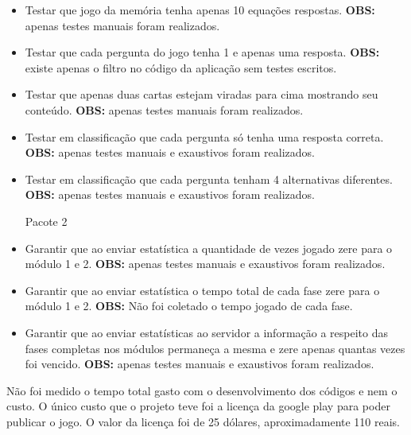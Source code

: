 \begin{itemize}
\item Testar que jogo da memória tenha apenas 10 equações respostas. \textbf{OBS:} apenas testes manuais foram realizados.  

\item Testar que cada pergunta do jogo tenha 1 e apenas uma resposta. \textbf{OBS:} existe apenas o filtro no código da aplicação sem testes escritos.  

\item Testar que apenas duas cartas estejam viradas para cima mostrando seu conteúdo. \textbf{OBS:} apenas testes manuais foram realizados.  

\item Testar em classificação que cada pergunta só tenha uma resposta correta. \textbf{OBS:} apenas testes manuais e exaustivos foram realizados.  

\item Testar em classificação que cada pergunta tenham 4 alternativas diferentes. \textbf{OBS:} apenas testes manuais e exaustivos foram realizados.  


	Pacote 2
\item Garantir que ao enviar estatística a quantidade de vezes jogado zere para o módulo 1 e 2. \textbf{OBS:} apenas testes manuais e exaustivos foram realizados.  

\item Garantir que ao enviar estatística o tempo  total de cada fase zere para o módulo 1 e 2. \textbf{OBS:} Não foi coletado o tempo jogado de cada fase.  

\item Garantir que ao enviar estatísticas ao servidor a informação a respeito das fases completas nos módulos permaneça a mesma e zere apenas quantas vezes foi vencido. \textbf{OBS:} apenas testes manuais e exaustivos foram realizados.  
\end{itemize}

Não foi medido o tempo total gasto com o desenvolvimento dos códigos e nem o custo. O único custo que o projeto teve foi a licença da google play para poder publicar o jogo. O valor da licença foi de 25 dólares, aproximadamente 110 reais. 
